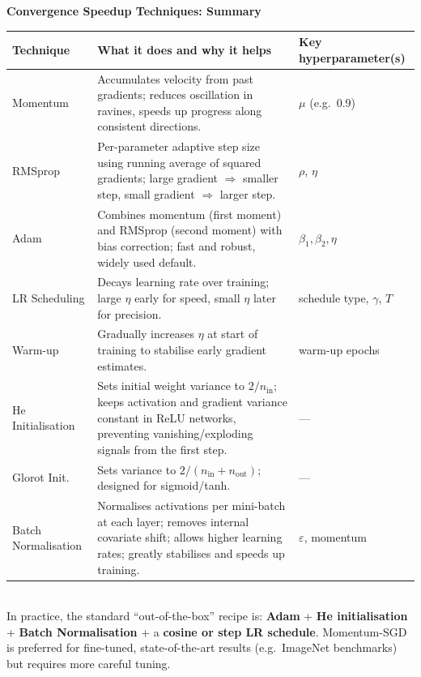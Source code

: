 \documentclass[11pt,a4paper]{article}
\begin{document}
\begin{tcolorbox}[colback=LightBlue,colframe=AccentBlue,boxrule=0.8pt,arc=3pt]
\textbf{Convergence Speedup Techniques: Summary}\\[6pt]
\begin{tabularx}{\linewidth}{@{}l X l@{}}
\toprule
\textbf{Technique} & \textbf{What it does and why it helps} & \textbf{Key hyperparameter(s)} \\
\midrule
Momentum
  & Accumulates velocity from past gradients; reduces oscillation in ravines, speeds up progress along consistent directions.
  & $\mu$ (e.g.\ 0.9) \\[4pt]
RMSprop
  & Per-parameter adaptive step size using running average of squared gradients; large gradient $\Rightarrow$ smaller step, small gradient $\Rightarrow$ larger step.
  & $\rho$, $\eta$ \\[4pt]
Adam
  & Combines momentum (first moment) and RMSprop (second moment) with bias correction; fast and robust, widely used default.
  & $\beta_1, \beta_2, \eta$ \\[4pt]
LR Scheduling
  & Decays learning rate over training; large $\eta$ early for speed, small $\eta$ later for precision.
  & schedule type, $\gamma$, $T$ \\[4pt]
Warm-up
  & Gradually increases $\eta$ at start of training to stabilise early gradient estimates.
  & warm-up epochs \\[4pt]
He Initialisation
  & Sets initial weight variance to $2/n_{\mathrm{in}}$; keeps activation and gradient variance constant in ReLU networks, preventing vanishing/exploding signals from the first step.
  & — \\[4pt]
Glorot Init.
  & Sets variance to $2/(n_{\mathrm{in}}+n_{\mathrm{out}})$; designed for sigmoid/tanh.
  & — \\[4pt]
Batch Normalisation
  & Normalises activations per mini-batch at each layer; removes internal covariate shift; allows higher learning rates; greatly stabilises and speeds up training.
  & $\varepsilon$, momentum \\
\bottomrule
\end{tabularx}\\[6pt]
In practice, the standard ``out-of-the-box'' recipe is: \textbf{Adam} + \textbf{He initialisation} + \textbf{Batch Normalisation} + a \textbf{cosine or step LR schedule}. Momentum-SGD is preferred for fine-tuned, state-of-the-art results (e.g.\ ImageNet benchmarks) but requires more careful tuning.
\end{tcolorbox}
\end{document}

